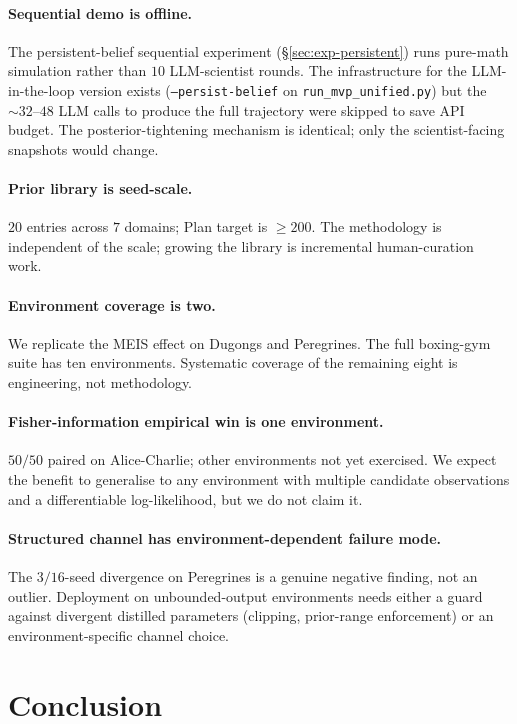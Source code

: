 \documentclass{article}
\begin{document}
\paragraph{Sequential demo is offline.} The persistent-belief
sequential experiment (\S\ref{sec:exp-persistent}) runs
pure-math simulation rather than $10$ LLM-scientist rounds. The
infrastructure for the LLM-in-the-loop version exists
(\texttt{--persist-belief} on \texttt{run\_mvp\_unified.py}) but the
$\sim 32$--$48$ LLM calls to produce the full trajectory were
skipped to save API budget. The posterior-tightening mechanism is
identical; only the scientist-facing snapshots would change.

\paragraph{Prior library is seed-scale.} $20$ entries across $7$
domains; Plan target is $\geq 200$. The methodology is independent
of the scale; growing the library is incremental human-curation
work.

\paragraph{Environment coverage is two.} We replicate the MEIS
effect on Dugongs and Peregrines. The full boxing-gym suite has ten
environments. Systematic coverage of the remaining eight is
engineering, not methodology.

\paragraph{Fisher-information empirical win is one environment.}
$50/50$ paired on Alice-Charlie; other environments not yet
exercised. We expect the benefit to generalise to any environment
with multiple candidate observations and a differentiable
log-likelihood, but we do not claim it.

\paragraph{Structured channel has environment-dependent failure mode.}
The $3 / 16$-seed divergence on Peregrines is a genuine negative
finding, not an outlier. Deployment on
unbounded-output environments needs either a guard against
divergent distilled parameters (clipping, prior-range
enforcement) or an environment-specific channel choice.

\section{Conclusion}
\label{sec:conclusion}
\end{document}
